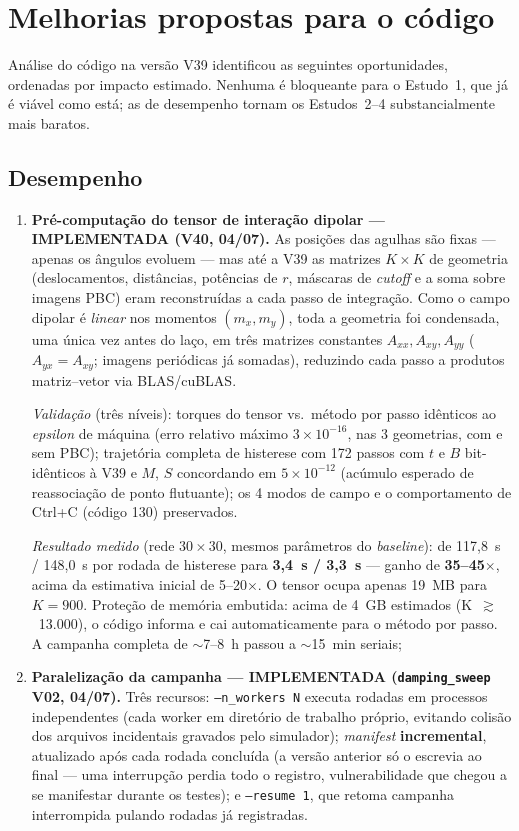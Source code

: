 \documentclass[11pt,a4paper]{article}
\newcommand{\code}[1]{\texttt{#1}}
\begin{document}
\section{Melhorias propostas para o código}
\label{sec:melhorias}

Análise do código na versão V39 identificou as seguintes oportunidades,
ordenadas por impacto estimado. Nenhuma é bloqueante para o Estudo~1,
que já é viável como está; as de desempenho tornam os Estudos~2--4
substancialmente mais baratos.

\subsection{Desempenho}

\begin{enumerate}
\item \textbf{Pré-computação do tensor de interação dipolar ---
IMPLEMENTADA (V40, 04/07).} As posições das agulhas são fixas --- apenas
os ângulos evoluem --- mas até a V39 as matrizes $K \times K$ de
geometria (deslocamentos, distâncias, potências de $r$, máscaras de
\emph{cutoff} e a soma sobre imagens PBC) eram reconstruídas a cada
passo de integração. Como o campo dipolar é \emph{linear} nos momentos
$(m_x, m_y)$, toda a geometria foi condensada, uma única vez antes do
laço, em três matrizes constantes $A_{xx}, A_{xy}, A_{yy}$
($A_{yx} = A_{xy}$; imagens periódicas já somadas), reduzindo cada passo
a produtos matriz--vetor via BLAS/cuBLAS.

\emph{Validação} (três níveis): torques do tensor vs.\ método por passo
idênticos ao \emph{epsilon} de máquina (erro relativo máximo
$3 \times 10^{-16}$, nas 3 geometrias, com e sem PBC); trajetória
completa de histerese com 172 passos com $t$ e $B$ bit-idênticos à V39 e
$M$, $S$ concordando em $5 \times 10^{-12}$ (acúmulo esperado de
reassociação de ponto flutuante); os 4 modos de campo e o comportamento
de \mbox{Ctrl+C} (código 130) preservados.

\emph{Resultado medido} (rede $30\times30$, mesmos parâmetros do
\emph{baseline}): de 117{,}8~s / 148{,}0~s por rodada de histerese para
\textbf{3{,}4~s / 3{,}3~s} --- ganho de \textbf{35--45$\times$}, acima
da estimativa inicial de 5--20$\times$. O tensor ocupa apenas 19~MB para
$K = 900$. Proteção de memória embutida: acima de 4~GB estimados
(K~$\gtrsim$~13.000), o código informa e cai automaticamente para o
método por passo. A campanha completa de $\sim$7--8~h passou a
$\sim$15~min seriais;
\item \textbf{Paralelização da campanha --- IMPLEMENTADA
(\code{damping\_sweep} V02, 04/07).} Três recursos: \code{--n\_workers~N}
executa rodadas em processos independentes (cada worker em diretório de
trabalho próprio, evitando colisão dos arquivos incidentais gravados
pelo simulador); \emph{manifest} \textbf{incremental}, atualizado após
cada rodada concluída (a versão anterior só o escrevia ao final --- uma
interrupção perdia todo o registro, vulnerabilidade que chegou a se
manifestar durante os testes); e \code{--resume~1}, que retoma campanha
interrompida pulando rodadas já registradas.


\end{enumerate}
\end{document}
